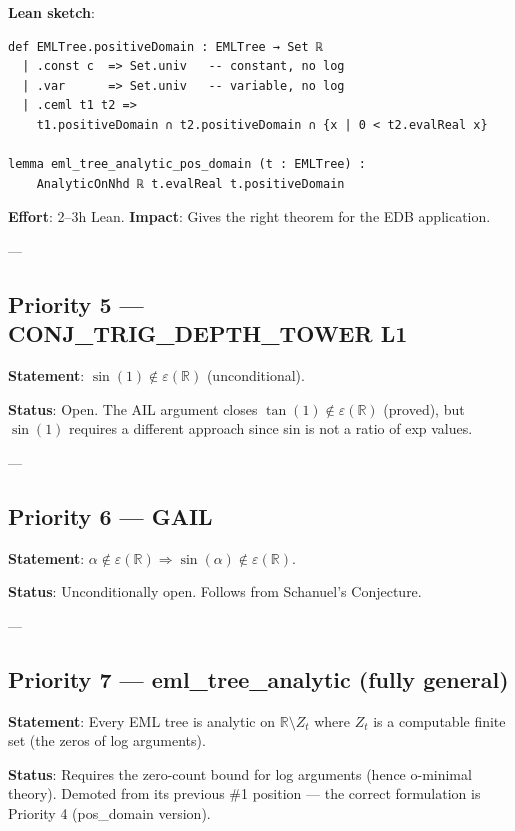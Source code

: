 \documentclass[12pt]{article}
\theoremstyle{definition}
\begin{document}
\textbf{Lean sketch}:
\begin{verbatim}
def EMLTree.positiveDomain : EMLTree → Set ℝ
  | .const c  => Set.univ   -- constant, no log
  | .var      => Set.univ   -- variable, no log
  | .ceml t1 t2 =>
    t1.positiveDomain ∩ t2.positiveDomain ∩ {x | 0 < t2.evalReal x}

lemma eml_tree_analytic_pos_domain (t : EMLTree) :
    AnalyticOnNhd ℝ t.evalReal t.positiveDomain
\end{verbatim}

\textbf{Effort}: 2–3h Lean.  \textbf{Impact}: Gives the right theorem for the EDB application.

---

\subsection{\textcolor{low}{Priority 5 — CONJ\_TRIG\_DEPTH\_TOWER L1}}

\textbf{Statement}: $\sin(1) \notin \varepsilon(\mathbb{R})$ (unconditional).

\textbf{Status}: Open. The AIL argument closes $\tan(1) \notin \varepsilon(\mathbb{R})$ (proved),
but $\sin(1)$ requires a different approach since sin is not a ratio of exp values.

---

\subsection{\textcolor{low}{Priority 6 — GAIL}}

\textbf{Statement}: $\alpha \notin \varepsilon(\mathbb{R}) \Rightarrow \sin(\alpha) \notin \varepsilon(\mathbb{R})$.

\textbf{Status}: Unconditionally open. Follows from Schanuel's Conjecture.

---

\subsection{\textcolor{low}{Priority 7 — eml\_tree\_analytic (fully general)}}

\textbf{Statement}: Every EML tree is analytic on $\mathbb{R} \setminus Z_t$ where $Z_t$ is
a computable finite set (the zeros of log arguments).

\textbf{Status}: Requires the zero-count bound for log arguments (hence o-minimal theory).
Demoted from its previous \#1 position — the correct formulation is Priority 4 (pos\_domain version).
\end{document}
